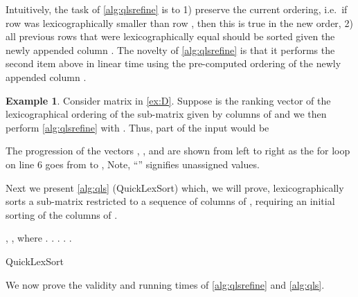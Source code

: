 \documentclass[a4paper,10pt,reqno]{amsart}
\theoremstyle{definition}
\newtheorem{example}{Example}
\begin{document}
Intuitively, the task of \autoref{alg:qlsrefine} is to 1) preserve the current
ordering, i.e.\ if row  was lexicographically smaller than row , then
this is true in the new order, 2) all previous rows that were lexicographically
equal should be sorted given the newly appended column . The novelty of
\autoref{alg:qlsrefine} is that it performs the second item above in linear
time using the pre-computed ordering of the newly appended column . 

\begin{example}
Consider matrix  in \autoref{ex:D}. Suppose  is the ranking vector of the
lexicographical ordering of the sub-matrix given by columns  of 
and we then perform \autoref{alg:qlsrefine} with . Thus, part of the input would be 


The progression of the vectors , , and  are shown from
left to right as the for loop on line 6 goes from  to , Note, ``''
signifies unassigned values.



\end{example}

Next we present \autoref{alg:qls} (QuickLexSort) which, we will prove,
lexicographically sorts a sub-matrix restricted to a sequence of columns of
, requiring  an initial sorting of the columns of .  


\begin{algorithm}[!h]
\begin{algorithmic}[1]
    \REQUIRE , ,  where  .
    \ENSURE .
    \STATE .
    \FORALL{ }
        \STATE .
    \ENDFOR
    \RETURN .
\end{algorithmic}
\caption{QuickLexSort}
\label{alg:qls}
\end{algorithm}

We now prove the validity and running times of \autoref{alg:qlsrefine}
and \autoref{alg:qls}. 
\end{document}

